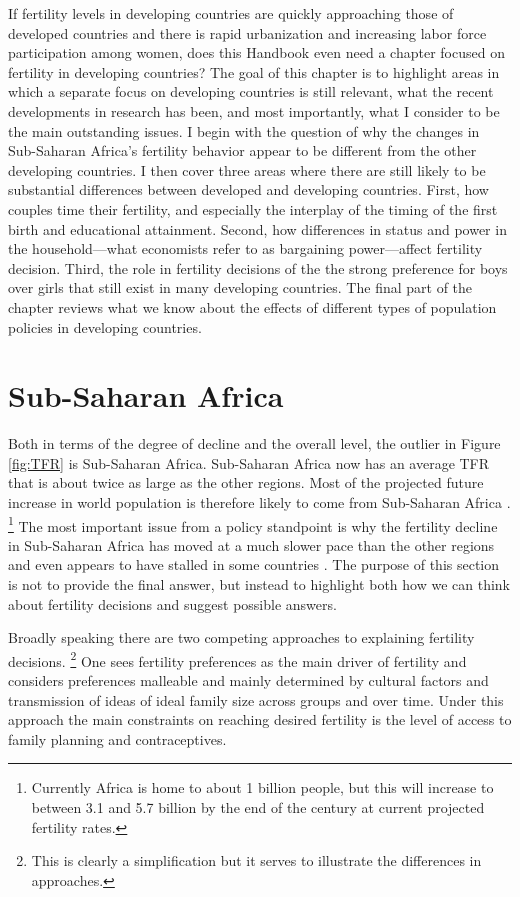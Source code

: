 \documentclass[letterpaper,12pt]{article}
\begin{document}
If fertility levels in developing countries are quickly approaching 
those of developed countries and there is rapid urbanization and increasing labor
force participation among women, does this Handbook even need a chapter
focused on fertility in developing countries? 
The goal of this chapter is to highlight areas in which a separate focus 
on developing countries is still relevant, what the recent developments 
in research has been, and most importantly, what I consider to be the 
main outstanding issues.
I begin with the question of why the changes in Sub-Saharan Africa's 
fertility behavior appear to be different from the other developing countries. 
I then cover three areas where there are still likely to be substantial
differences between developed and developing countries.
First, how couples time their fertility, and especially the interplay of
the timing of the first birth and educational attainment.
Second, how differences in status and power in the household---what economists 
refer to as bargaining power---affect fertility decision.
Third, the role in fertility decisions of the the strong preference for boys 
over girls that still exist in many developing countries. 
The final part of the chapter reviews what we know about the effects
of different types of population policies in developing countries.


\section{Sub-Saharan Africa}

Both in terms of the degree of decline and the overall level, the
outlier in Figure \ref{fig:TFR} is Sub-Saharan Africa.
Sub-Saharan Africa now has an average TFR that is about twice as large
as the other regions.
Most of the projected future increase in world population is therefore
likely to come from Sub-Saharan Africa \citep{Gerland2014}.%
\footnote{
Currently Africa is home to about 1 billion people, but this will
increase to between 3.1 and 5.7 billion by the end of the century at
current projected fertility rates.}
The most important issue from a policy standpoint is why the fertility
decline in Sub-Saharan Africa has moved at a much slower pace than the
other regions and even appears to have stalled in some countries
\citep{Ainsworth1996a,Singh2017}.
The purpose of this section is not to provide the final answer, but
instead to highlight both how we can think about fertility decisions and
suggest possible answers.

Broadly speaking there are two competing approaches to explaining
fertility decisions.%
\footnote{
This is clearly a simplification but it serves to illustrate the
differences in approaches.}
One sees fertility preferences as the main driver of fertility and
considers preferences malleable and mainly determined by cultural
factors and transmission of ideas of ideal family size across groups and
over time.
Under this approach the main constraints on reaching desired fertility
is the level of access to family planning and contraceptives.
\end{document}
